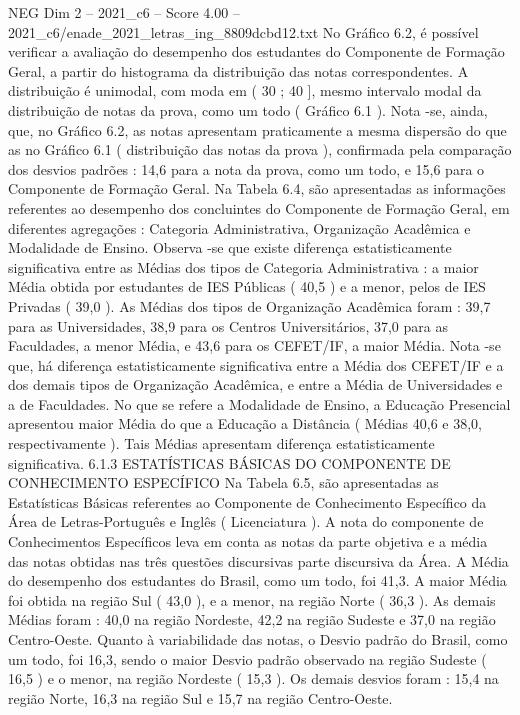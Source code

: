 \begin{textsample}{NEG Dim 2 – 2021\_c6 – Score 4.00 – 2021\_c6/enade\_2021\_letras\_ing\_8809dcbd12.txt}
No Gráfico 6.2, é possível verificar a avaliação do desempenho dos estudantes do Componente de Formação Geral, a partir do histograma da distribuição das notas correspondentes.
A distribuição é unimodal, com moda em ( 30 ; 40 ], mesmo intervalo modal da distribuição de notas da prova, como um todo ( Gráfico 6.1 ).
Nota -se, ainda, que, no Gráfico 6.2, as notas apresentam praticamente a mesma dispersão do que as no Gráfico 6.1 ( distribuição das notas da prova ), confirmada pela comparação dos desvios padrões : 14,6 para a nota da prova, como um todo, e 15,6 para o Componente de Formação Geral.
Na Tabela 6.4, são apresentadas as informações referentes ao desempenho dos concluintes do Componente de Formação Geral, em diferentes agregações : Categoria Administrativa, Organização Acadêmica e Modalidade de Ensino.
Observa -se que existe diferença estatisticamente significativa entre as Médias dos tipos de Categoria Administrativa : a maior Média obtida por estudantes de IES Públicas ( 40,5 ) e a menor, pelos de IES Privadas ( 39,0 ).
As Médias dos tipos de Organização Acadêmica foram : 39,7 para as Universidades, 38,9 para os Centros Universitários, 37,0 para as Faculdades, a menor Média, e 43,6 para os CEFET/IF, a maior Média.
Nota -se que, há diferença estatisticamente significativa entre a Média dos CEFET/IF e a dos demais tipos de Organização Acadêmica, e entre a Média de Universidades e a de Faculdades.
No que se refere a Modalidade de Ensino, a Educação Presencial apresentou maior Média do que a Educação a Distância ( Médias 40,6 e 38,0, respectivamente ).
Tais Médias apresentam diferença estatisticamente significativa. 6.1.3 ESTATÍSTICAS BÁSICAS DO COMPONENTE DE CONHECIMENTO ESPECÍFICO Na Tabela 6.5, são apresentadas as Estatísticas Básicas referentes ao Componente de Conhecimento Específico da Área de Letras-Português e Inglês ( Licenciatura ).
A nota do componente de Conhecimentos Específicos leva em conta as notas da parte objetiva e a média das notas obtidas nas três questões discursivas parte discursiva da Área.
A Média do desempenho dos estudantes do Brasil, como um todo, foi 41,3.
A maior Média foi obtida na região Sul ( 43,0 ), e a menor, na região Norte ( 36,3 ).
As demais Médias foram : 40,0 na região Nordeste, 42,2 na região Sudeste e 37,0 na região Centro-Oeste.
Quanto à variabilidade das notas, o Desvio padrão do Brasil, como um todo, foi 16,3, sendo o maior Desvio padrão observado na região Sudeste ( 16,5 ) e o menor, na região Nordeste ( 15,3 ).
Os demais desvios foram : 15,4 na região Norte, 16,3 na região Sul e 15,7 na região Centro-Oeste.

\end{textsample}
